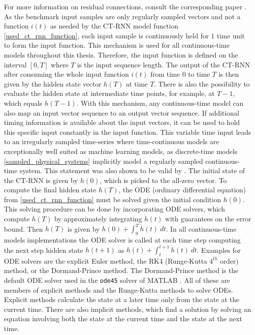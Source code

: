 \documentclass[draft,final]{vutinfth} %
\begin{document}
    For more information on residual connections, consult the corresponding paper \cite{ResNet}.
    As the benchmark input samples are only regularly sampled vectors and not a function $i(t)$ as needed by the CT-RNN model function \ref{used_ct_rnn_function}, each input sample is continuously held for $1$ time unit to form the input function.
    This mechanism is used for all continuous-time models throughout this thesis.
    Therefore, the input function is defined on the interval $[0, T]$ where $T$ is the input sequence length.
    The output of the CT-RNN after consuming the whole input function $i(t)$ from time $0$ to time $T$ is then given by the hidden state vector $h(T)$ at time $T$.
    There is also the possibility to evaluate the hidden state at intermediate time points, for example, at $T-1$, which equals $h(T-1)$.
    With this mechanism, any continuous-time model can also map an input vector sequence to an output vector sequence.
    If additional timing information is available about the input vectors, it can be used to hold this specific input constantly in the input function.
    This variable time input leads to an irregularly sampled time-series where time-continuous models are exceptionally well suited as machine learning models, as discrete-time models \ref{sampled_physical_systems} implicitly model a regularly sampled continuous-time system.
    This statement was also shown to be valid by \cite{ODELSTM}.
    The initial state of the CT-RNN is given by $h(0)$, which is picked to the all-zero vector.
    To compute the final hidden state $h(T)$, the ODE (ordinary differential equation) from \ref{used_ct_rnn_function} must be solved given the initial condition $h(0)$.
    This solving procedure can be done by incorporating ODE solvers, which compute $h(T)$ by approximately integrating $\dot h(t)$ with guarantees on the error bound.
    Then $h(T)$ is given by $h(0) + \int_0^T{\dot h(t)}~dt$. 
    In all continuous-time models implementations the ODE solver is called at each time step computing the next step hidden state $h(t+1)$ as $h(t) + \int_t^{t+1}{\dot h(t)}~dt$.
    Examples for ODE solvers are the explicit Euler method, the RK4 (Runge-Kutta $4^{th}$ order) method, or the Dormand-Prince method.
    The Dormand-Prince method is the default ODE solver used in the \texttt{ode45} solver of MATLAB \cite{MATLAB}.
    All of these are members of explicit methods and the Runge-Kutta methods to solve ODEs. Explicit methods calculate the state at a later time only from the state at the current time.
    There are also implicit methods, which find a solution by solving an equation involving both the state at the current time and the state at the next time.
\end{document}
